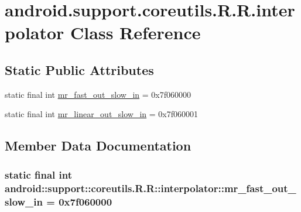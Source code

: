 \hypertarget{classandroid_1_1support_1_1coreutils_1_1_r_1_1interpolator}{
\section{android.support.coreutils.R.R.interpolator Class Reference}
\label{classandroid_1_1support_1_1coreutils_1_1_r_1_1interpolator}
}
\subsection*{Static Public Attributes}
\begin{CompactItemize}
\item 
static final int \hyperlink{classandroid_1_1support_1_1coreutils_1_1_r_1_1interpolator_7bf21ef0aedd2e9b257de97c7fb28df2}{mr\_\-fast\_\-out\_\-slow\_\-in} = 0x7f060000
\item 
static final int \hyperlink{classandroid_1_1support_1_1coreutils_1_1_r_1_1interpolator_c38b664030a36dae601ce48a4efa2db4}{mr\_\-linear\_\-out\_\-slow\_\-in} = 0x7f060001
\end{CompactItemize}


\subsection{Member Data Documentation}
\hypertarget{classandroid_1_1support_1_1coreutils_1_1_r_1_1interpolator_7bf21ef0aedd2e9b257de97c7fb28df2}{
\subsubsection[{mr\_\-fast\_\-out\_\-slow\_\-in}]{\setlength{\rightskip}{0pt plus 5cm}static final int android::support::coreutils.R.R::interpolator::mr\_\-fast\_\-out\_\-slow\_\-in = 0x7f060000}}
\label{classandroid_1_1support_1_1coreutils_1_1_r_1_1interpolator_7bf21ef0aedd2e9b257de97c7fb28df2}



